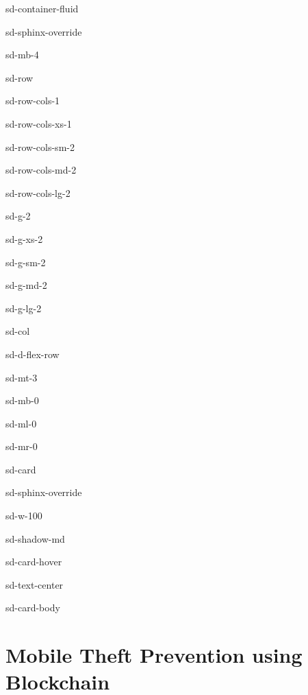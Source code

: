 \documentclass[letterpaper,10pt,english]{jupyterBook}
\begin{document}
\begin{sphinxuseclass}{sd-container-fluid}
\begin{sphinxuseclass}{sd-sphinx-override}
\begin{sphinxuseclass}{sd-mb-4}
\begin{sphinxuseclass}{sd-row}
\begin{sphinxuseclass}{sd-row-cols-1}
\begin{sphinxuseclass}{sd-row-cols-xs-1}
\begin{sphinxuseclass}{sd-row-cols-sm-2}
\begin{sphinxuseclass}{sd-row-cols-md-2}
\begin{sphinxuseclass}{sd-row-cols-lg-2}
\begin{sphinxuseclass}{sd-g-2}
\begin{sphinxuseclass}{sd-g-xs-2}
\begin{sphinxuseclass}{sd-g-sm-2}
\begin{sphinxuseclass}{sd-g-md-2}
\begin{sphinxuseclass}{sd-g-lg-2}
\begin{sphinxuseclass}{sd-col}
\begin{sphinxuseclass}{sd-d-flex-row}
\begin{sphinxuseclass}{sd-mt-3}
\begin{sphinxuseclass}{sd-mb-0}
\begin{sphinxuseclass}{sd-ml-0}
\begin{sphinxuseclass}{sd-mr-0}
\begin{sphinxuseclass}{sd-card}
\begin{sphinxuseclass}{sd-sphinx-override}
\begin{sphinxuseclass}{sd-w-100}
\begin{sphinxuseclass}{sd-shadow-md}
\begin{sphinxuseclass}{sd-card-hover}
\begin{sphinxuseclass}{sd-text-center}
\begin{sphinxuseclass}{sd-card-body}
\end{sphinxuseclass}
\end{sphinxuseclass}
\end{sphinxuseclass}
\end{sphinxuseclass}
\end{sphinxuseclass}
\end{sphinxuseclass}
\end{sphinxuseclass}
\end{sphinxuseclass}
\end{sphinxuseclass}
\end{sphinxuseclass}
\end{sphinxuseclass}
\end{sphinxuseclass}
\end{sphinxuseclass}
\end{sphinxuseclass}
\end{sphinxuseclass}
\end{sphinxuseclass}
\end{sphinxuseclass}
\end{sphinxuseclass}
\end{sphinxuseclass}
\end{sphinxuseclass}
\end{sphinxuseclass}
\end{sphinxuseclass}
\end{sphinxuseclass}
\end{sphinxuseclass}
\end{sphinxuseclass}
\end{sphinxuseclass}
\end{sphinxuseclass}
\sphinxstepscope


\section{Mobile Theft Prevention using Blockchain}
\label{\detokenize{MTP/mtp:mobile-theft-prevention-using-blockchain}}\label{\detokenize{MTP/mtp::doc}}


\sphinxAtStartPar
{}
\end{document}
